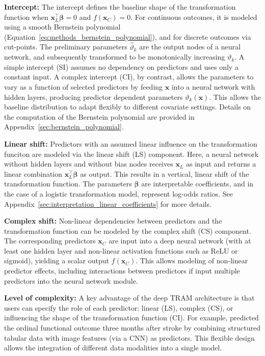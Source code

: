\textbf{Intercept:} The intercept defines the baseline shape of the transformation function when $\mathbf{x}_{L}^\top \boldsymbol{\beta} = 0$ and $f(\mathbf{x}_{C}) = 0$. For continuous outcomes, it is modeled using a smooth Bernstein polynomial (Equation~\ref{eq:methods_bernstein_polynomial}), and for discrete outcomes via cut-points. The preliminary parameters $\hat{\vartheta}_k$ are the output nodes of a neural network, and subsequently transformed to be monotonically increasing $\vartheta_k$. A simple intercept (SI) assumes no dependency on predictors and uses only a constant input. A complex intercept (CI), by contrast, allows the parameters to vary as a function of selected predictors by feeding $\mathbf{x}$ into a neural network with hidden layers, producing predictor dependent parameters $\vartheta_k(\mathbf{x})$. This allows the baseline distribution to adapt flexibly to different covariate settings. Details on the computation of the Bernstein polynomial are provided in Appendix~\ref{sec:bernstein_polynomial}.


\textbf{Linear shift:} Predictors with an assumed linear influence on the transformation funciton are modeled via the linear shift (LS) component. Here, a neural network without hidden layers and without bias nodes receives $\mathbf{x}_{L}$ as input and returns a linear combination $\mathbf{x}_{L}^\top \boldsymbol{\beta}$ as output. This results in a vertical, linear shift of the transformation function. The parameters $\boldsymbol{\beta}$ are interpretable coefficients, and in the case of a logistic transformation model, represent log-odds ratios. See Appendix~\ref{sec:interpretation_linear_coefficients} for more details.

\textbf{Complex shift:} Non-linear dependencies between predictors and the transformation function can be modeled by the complex shift (CS) component. The corresponding predictors $\mathbf{x}_{C}$ are input into a deep neural network (with at least one hidden layer and non-linear activation functions such as ReLU or sigmoid), yielding a scalar output $f(\mathbf{x}_{C})$. This allows modeling of non-linear predictor effects, including interactions between predictors if input multiple predictors into the neural network module.

\textbf{Level of complexity:} A key advantage of the deep TRAM architecture is that users can specify the role of each predictor: linear (LS), complex (CS), or influencing the shape of the transformation function (CI). For example, \citet{herzog2023} predicted the ordinal functional outcome three months after stroke by combining structured tabular data with image features (via a CNN) as predictors. This flexible design allows the integration of different data modalities into a single model.



